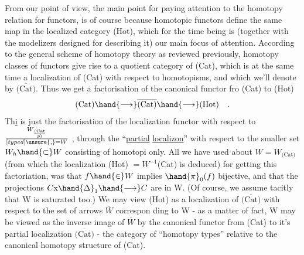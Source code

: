 
From our point of view, the main point for paying attention to the
homotopy relation for functors, is of course because homotopic functors
define the same map in the localized category (Hot), which  for the time
being is (together with the modelizers designed for describing it) our
main focus of attention. According to the general scheme of homotopy
theory as reviewed previously, homotopy classes of functors give rise
to a quotient category of (Cat), which is at the same time a localization
of (Cat) with respect to homotopisms, and which we'll denote by $\overline{\text{(Cat)}}$.
Thus we get a factorisation of the canonical functor fro (Cat) to (Hot)
\[ \text{(Cat)} \hand{\ensuremath{\longrightarrow}} \overline{\text{(Cat)}} \hand{\ensuremath{\longrightarrow}} \text{(Hot)} \quad . \]
Th\uline{i} is just the factorisation of the localization functor with respect
to $W_{\text{(Cat}\over{p}{)}} \over[typed]{\unsure{,}}{=} W$ , through the ``\uline{partial} \uline{localizon}'' with respect to the
smaller set $W_h \hand{\ensuremath{\subset}} W$ consisting of homotopi only. All we have used about
$W = W_{\text{(Cat)}}$ (from which the localization (Hot) $= W^{-1}$(Cat) is deduced) for
getting this factoriation, was that $f \hand{\ensuremath{\in}} W$ implies $\hand{\ensuremath{\pi}}_0(f)$ bijective,\hand{*} and
that the projections $C\mathrm{x}\hand{\ensuremath{\Delta}}_1 \hand{\ensuremath{\longrightarrow}} C$ are in W. (Of course, we assume tacitly
that W is saturated too.)  We may view (Hot)
as a localization of $\overline{\text{(Cat)}}$ with respect to the set of arrows $\overline{W}$ correspon%
ding to W - as a matter of fact, W may be viewed as the inverse image
of $\overline{W}$ by the canonical functor from (Cat) to it's partial localization
$\overline{\text{(Cat)}}$ - the category of ``homotopy types'' relative to the canonical
homotopy structure of (Cat).

